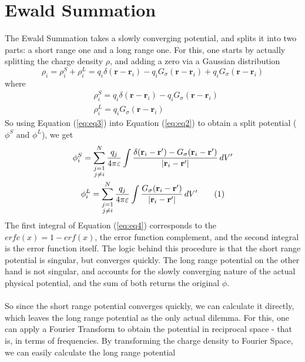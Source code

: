\documentclass[a4paper, 12pt, notitlepage]{article}
\newcommand\numberthis{\addtocounter{equation}{1}\tag{\theequation}}
\begin{document}
\section{Ewald Summation}\label{sec:ES}
The Ewald Summation takes a slowly converging potential, and splits it into two parts: a short range one and a long range one. For this, one starts by actually splitting the charge density $\rho$, and adding a zero via a Gaussian distribution
\begin{equation}
\rho_i = \rho_i^S + \rho_i^L = q_i\delta(\mathbf{r} - \mathbf{r}_i) - q_i G_\sigma(\mathbf{r} - \mathbf{r}_i) + q_i G_\sigma(\mathbf{r} - \mathbf{r}_i)\label{eq:eq3}
\end{equation}
where
\begin{align*}
&\rho_i^S = q_i\delta(\mathbf{r} - \mathbf{r}_i) - q_i G_\sigma (\mathbf{r} - \mathbf{r}_i)\\
&\rho_i^L = q_i G_\sigma (\mathbf{r} - \mathbf{r}_i)
\end{align*}
So using Equation (\ref{eq:eq3}) into Equation (\ref{eq:eq2}) to obtain a split potential ($\phi^S$ and $\phi^L$), we get
\begin{gather*}
	\phi_i^S = \sum_{\substack{j=1\\j\neq i}}^{N}\frac{q_j}{4\pi\varepsilon}\int\frac{\delta(\mathbf{r}_i - \mathbf{r}') - G_\sigma (\mathbf{r}_i - \mathbf{r}')}{|\mathbf{r}_i - \mathbf{r}'|}\, dV'\\
	\phi_i^L = \sum_{\substack{j = 1\\j\neq i}}^{N}\frac{q_j}{4\pi\varepsilon} \int \frac{G_\sigma(\mathbf{r}_i - \mathbf{r}')}{|\mathbf{r}_i - \mathbf{r}'|}\, d V' \numberthis \label{eq:eq4}
\end{gather*}
The first integral of Equation (\ref{eq:eq4}) corresponds to the $erfc(x) = 1 - erf(x)$, the error function complement, and the second integral is the error function itself. The logic behind this procedure is that the short range potential is singular, but converges quickly. The long range potential on the other hand is not singular, and accounts for the slowly converging nature of the actual physical potential, and the sum of both returns the original $\phi$.\\\\
So since the short range potential converges quickly, we can calculate it directly, which leaves the long range potential as the only actual dilemma. For this, one can apply a Fourier Transform to obtain the potential in reciprocal space - that is, in terms of frequencies. By transforming the charge density to Fourier Space, we can easily calculate the long range potential
\end{document}
